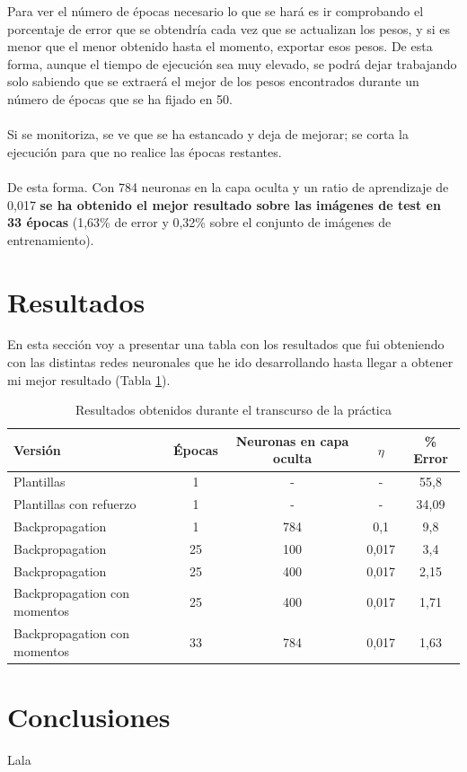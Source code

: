 Para ver el número de épocas necesario lo que se hará es ir comprobando el porcentaje de error que se obtendría cada vez que se actualizan los pesos, y si es menor que el menor obtenido hasta el momento, exportar esos pesos. De esta forma, aunque el tiempo de ejecución sea muy elevado, se podrá dejar trabajando solo sabiendo que se extraerá el mejor de los pesos encontrados durante un número de épocas que se ha fijado en 50.
\\ \\
Si se monitoriza, se ve que se ha estancado y deja de mejorar; se corta la ejecución para que no realice las épocas restantes.
\\ \\
De esta forma. Con 784 neuronas en la capa oculta y un ratio de aprendizaje de 0,017 \textbf{se ha obtenido el mejor resultado sobre las imágenes de test en 33 épocas} (1,63\% de error y 0,32\% sobre el conjunto de imágenes de entrenamiento).

\section{Resultados}

En esta sección voy a presentar una tabla con los resultados que fui obteniendo con las distintas redes neuronales que he ido desarrollando hasta llegar a obtener mi mejor resultado (Tabla \ref{tab:results}).

\begin{table}[H]
	\centering
	\caption{Resultados obtenidos durante el transcurso de la práctica}
	\label{tab:results}
	\begin{tabular}{| l | c | c | c | c |}
		\hline
		Versión & Épocas & Neuronas en capa oculta & $\eta$ & \% Error \\ 
		\hline
		Plantillas & 1 & - & - & 55,8 \\
		Plantillas con refuerzo & 1 & - & - & 34,09 \\
		Backpropagation & 1 & 784 & 0,1 & 9,8 \\
		Backpropagation & 25 & 100 & 0,017 & 3,4 \\
		Backpropagation & 25 & 400 & 0,017 & 2,15 \\
		Backpropagation con momentos & 25 & 400 & 0,017 & 1,71 \\
		Backpropagation con momentos & 33 & 784 & 0,017 & 1,63 \\
		\hline
	\end{tabular}
\end{table}

\section{Conclusiones}

Lala



\newpage



